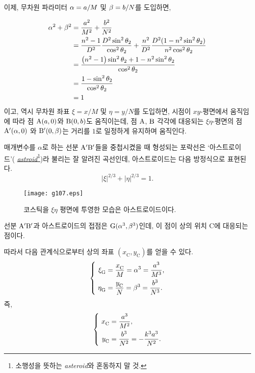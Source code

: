 \documentclass[twocolumn]{article}
\begin{document}
이제, 무차원 파라미터 ${\alpha}={a}/M$ 및 ${\beta}={b}/N$를 도입하면,

$$ \begin{aligned}
	\greeka^2 + \greekb^2 &= \dfrac{\romana^2}{M^2}+\dfrac{\romanb^2}{N^2}\\
	&=\dfrac{n^2-1}{D^2}\dfrac{D^2\sin^2\theta_2}{\cos^2\theta_2}%
	+\dfrac{n^2}{D^2}\dfrac{D^2(1-n^2\sin^2\theta_2)}{n^2\cos^2\theta_2}\\
	&=\dfrac{\left(n^2-1\right)\sin^2\theta_2 + 1-n^2\sin^2\theta_2}
	{\cos^2\theta_2}\\
	&=\dfrac{1-\sin^2\theta_2}{\cos^2\theta_2}\\
	&= 1
\end{aligned}$$
%
이고, 역시 무차원 좌표 $\xi=x/M$ 및 $\eta=y/N$를 도입하면, 시점이 $xy$-평면에서 움직임에 따라 점 $\mathrm{{A}}({a}, 0)$와 $\mathrm{{B}}(0, {b})$도 움직이는데, 점 $\mathrm{{A}}$, $\mathrm{{B}}$ 각각에 대응되는  $\xi\eta$-평면의 점 $\mathrm{{A^{\prime}}}({\alpha}, 0)$
와 $\mathrm{{B^{\prime}}}(0, {\beta})$는 거리를 $1$로 일정하게 유지하며 움직인다.

매개변수를 $\alpha$로 하는 선분 ${\mathrm{{A^{\prime}}{B^{\prime}}}}$들을 중첩시켰을 때 형성되는 포락선은 `아스트로이드'(%
\href{https://en.wikipedia.org/wiki/Astroid}{\emph{astroid}}\footnote{
소행성을 뜻하는 \emph{asteroid}와 혼동하지 말 것.})라 불리는 잘 알려진 곡선인데, 아스트로이드는 다음 방정식으로 표현된다.
$$ \left| \xi \right|^{2/3} + \left| \eta \right|^{2/3} = 1. $$

\begin{figure}[h]
	\centering
	\texttt{[image: g107.eps]}	
	\caption{코스틱을 $\xi\eta$ 평면에 투영한 모습은 아스트로이드이다.}
	\label{fig:astroid}
\end{figure}

선분 ${\mathrm{{A^{\prime}}{B^{\prime}}}}$과
아스트로이드의 접점은 $\mathrm{G}({\alpha}^3, {\beta}^3)$인데, 이 점이 상의 위치 $\mathrm{C}$에 대응되는 점이다.
	
따라서 다음 관계식으로부터 상의 좌표 $(x_{\mathrm{C}}^{}, y_{\mathrm{C}}^{})$를 얻을 수 있다.
$$ \left\{ 
\begin{aligned}
	\xi_{\mathrm{G}}^{} &= \dfrac{x_{\mathrm{C}}^{}}{M} = \greeka^3 = \dfrac{\romana^3}{M^3},\\
	\eta_{\mathrm{G}}^{} &= \dfrac{y_{\mathrm{C}}^{}}{N} = \greekb^3 = \dfrac{\romanb^3}{N^3}.
\end{aligned}
\right.$$
즉,
$$ \left\{ 
\begin{aligned}
	x_{\mathrm{C}}^{} &= \dfrac{\romana^3}{M^2},\\
	y_{\mathrm{C}}^{} &= \dfrac{\romanb^3}{N^2}=-\dfrac{k^3\romana^3}{N^2}.
\end{aligned}
\right.$$
\end{document}
